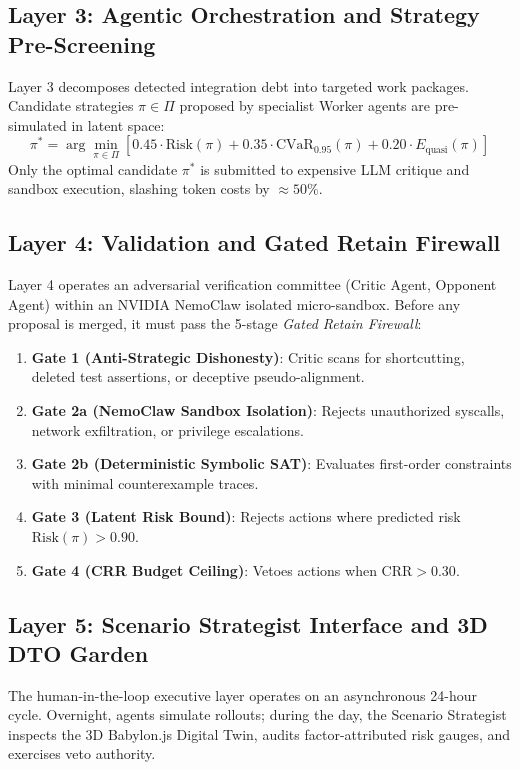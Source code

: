 \documentclass[11pt,a4paper]{article}
\begin{document}
\subsection{Layer 3: Agentic Orchestration and Strategy Pre-Screening}
Layer 3 decomposes detected integration debt into targeted work packages. Candidate strategies $\pi \in \Pi$ proposed by specialist Worker agents are pre-simulated in latent space:
\begin{equation}
    \pi^* = \arg\min_{\pi \in \Pi} \left[ 0.45 \cdot \text{Risk}(\pi) + 0.35 \cdot \text{CVaR}_{0.95}(\pi) + 0.20 \cdot E_{\text{quasi}}(\pi) \right]
\end{equation}
Only the optimal candidate $\pi^*$ is submitted to expensive LLM critique and sandbox execution, slashing token costs by $\approx 50\%$.

\subsection{Layer 4: Validation and Gated Retain Firewall}
Layer 4 operates an adversarial verification committee (Critic Agent, Opponent Agent) within an NVIDIA NemoClaw isolated micro-sandbox. Before any proposal is merged, it must pass the 5-stage \emph{Gated Retain Firewall}:
\begin{enumerate}
    \item \textbf{Gate 1 (Anti-Strategic Dishonesty)}: Critic scans for shortcutting, deleted test assertions, or deceptive pseudo-alignment.
    \item \textbf{Gate 2a (NemoClaw Sandbox Isolation)}: Rejects unauthorized syscalls, network exfiltration, or privilege escalations.
    \item \textbf{Gate 2b (Deterministic Symbolic SAT)}: Evaluates first-order constraints with minimal counterexample traces.
    \item \textbf{Gate 3 (Latent Risk Bound)}: Rejects actions where predicted risk $\text{Risk}(\pi) > 0.90$.
    \item \textbf{Gate 4 (CRR Budget Ceiling)}: Vetoes actions when $\text{CRR} > 0.30$.
\end{enumerate}

\subsection{Layer 5: Scenario Strategist Interface and 3D DTO Garden}
The human-in-the-loop executive layer operates on an asynchronous 24-hour cycle. Overnight, agents simulate rollouts; during the day, the Scenario Strategist inspects the 3D Babylon.js Digital Twin, audits factor-attributed risk gauges, and exercises veto authority.
\end{document}
